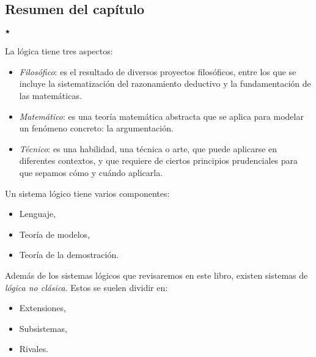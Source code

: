 \bigskip
\begin{resumen}
	\section*{Resumen del capítulo}	
	\begin{list}{$^\bigstar$}{}
		\item La lógica tiene tres aspectos:
		\begin{itemize}
			\item \textit{Filosófico}: es el resultado de diversos proyectos filosóficos, entre los que se incluye la sistematización del razonamiento deductivo y la fundamentación de las matemáticas.
			\item \textit{Matemático}: es una teoría matemática abstracta que se aplica para modelar un fenómeno concreto: la argumentación.
			\item \textit{Técnico}: es una habilidad, una técnica o arte, que puede aplicarse en diferentes contextos, y que requiere de ciertos principios prudenciales para que sepamos cómo y cuándo aplicarla.
		\end{itemize}
		\item Un sistema lógico tiene varios componentes:
		\begin{itemize}
			\item Lenguaje,
			\item Teoría de modelos,
			\item Teoría de la demostración.
		\end{itemize}
		\item Además de los sistemas lógicos que revisaremos en este libro, existen sistemas de \textit{lógica no clásica}. Estos se suelen dividir en:
		\begin{itemize}
			\item Extensiones,
			\item Subsistemas,
			\item Rivales.
		\end{itemize}
	\end{list}
\end{resumen} \bigskip

\printendnotes

